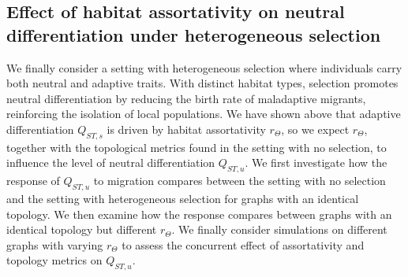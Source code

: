   \subsection{Effect of habitat assortativity on neutral differentiation under heterogeneous selection}
  We finally consider a setting with heterogeneous selection where individuals carry both neutral and adaptive traits. With distinct habitat types, selection promotes neutral differentiation by reducing the birth rate of maladaptive migrants, reinforcing the isolation of local populations. 
  We have shown above that adaptive differentiation $Q_{ST,s}$ is driven by habitat assortativity $r_\Theta$, so we expect $r_\Theta$, together with the topological metrics found in the setting with no selection, to influence the level of neutral differentiation $Q_{ST,u}$.
  We first investigate how the response of $Q_{ST,u}$ to migration compares between the setting with no selection and the setting with heterogeneous selection for graphs with an identical topology.
  We then examine how the response compares between graphs with an identical topology but different $r_\Theta$. We finally consider simulations on different graphs with varying $r_\Theta$ to assess the concurrent effect of assortativity and topology metrics on $Q_{ST,u}$.
  
